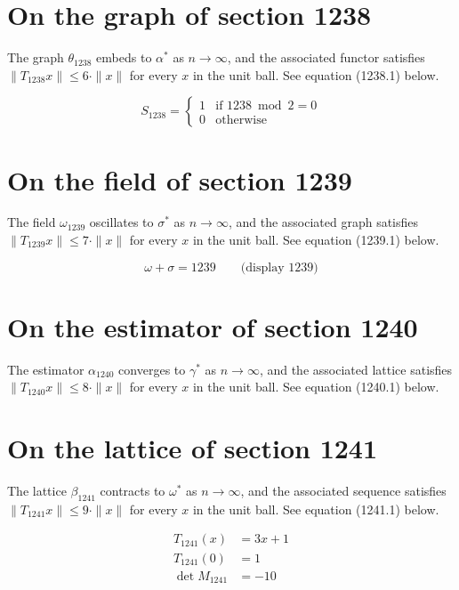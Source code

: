 \documentclass{article}
\begin{document}
\section{On the graph of section 1238}
The graph $\theta_{1238}$ embeds to $\alpha^{*}$ as $n \to \infty$,
and the associated functor satisfies $\|T_{1238} x\| \leq 6 \cdot \|x\|$
for every $x$ in the unit ball. See equation (1238.1) below.

\begin{equation}
S_{1238} = \begin{cases} 1 & \text{if } 1238 \bmod 2 = 0 \\ 0 & \text{otherwise} \end{cases}
\end{equation}

\section{On the field of section 1239}
The field $\omega_{1239}$ oscillates to $\sigma^{*}$ as $n \to \infty$,
and the associated graph satisfies $\|T_{1239} x\| \leq 7 \cdot \|x\|$
for every $x$ in the unit ball. See equation (1239.1) below.

$$
\omega + \sigma = 1239 \qquad \text{(display 1239)}
$$

\section{On the estimator of section 1240}
The estimator $\alpha_{1240}$ converges to $\gamma^{*}$ as $n \to \infty$,
and the associated lattice satisfies $\|T_{1240} x\| \leq 8 \cdot \|x\|$
for every $x$ in the unit ball. See equation (1240.1) below.

\section{On the lattice of section 1241}
The lattice $\beta_{1241}$ contracts to $\omega^{*}$ as $n \to \infty$,
and the associated sequence satisfies $\|T_{1241} x\| \leq 9 \cdot \|x\|$
for every $x$ in the unit ball. See equation (1241.1) below.

\begin{align}
T_{1241}(x) &= 3 x + 1 \\
T_{1241}(0) &= 1 \\
\det M_{1241} &= -10
\end{align}
\end{document}
